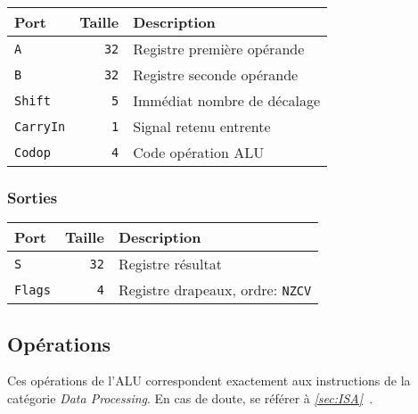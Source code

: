 \begin{tabular}{|l|r|l|}
\hline
\textbf{Port}		& \textbf{Taille} & \textbf{Description}\\
\hline

\texttt{A}		& \texttt{32} & Registre première opérande\\
\hline
\texttt{B}		& \texttt{32} & Registre seconde opérande\\
\hline
\texttt{Shift}		&  \texttt{5} & Immédiat nombre de décalage\\
\hline
\texttt{CarryIn}	&  \texttt{1} & Signal retenu entrente\\
\hline
\texttt{Codop}		&  \texttt{4} & Code opération ALU\\

\hline
\end{tabular}


\subsubsection{Sorties}

\begin{tabular}{|l|r|l|}
\hline 
\textbf{Port} & \textbf{Taille} & \textbf{Description}\\
\hline

\texttt{S}	& \texttt{32} & Registre résultat\\
\hline
\texttt{Flags}	&  \texttt{4} & Registre drapeaux, ordre: \texttt{NZCV}\\

\hline
\end{tabular}


\subsection{Opérations}
\label{subsec:Opcodes}
Ces opérations de l'ALU correspondent exactement aux instructions de la catégorie \textit{Data Processing}. En cas de doute, se référer à \textit{\ref{sec:ISA}~}.

